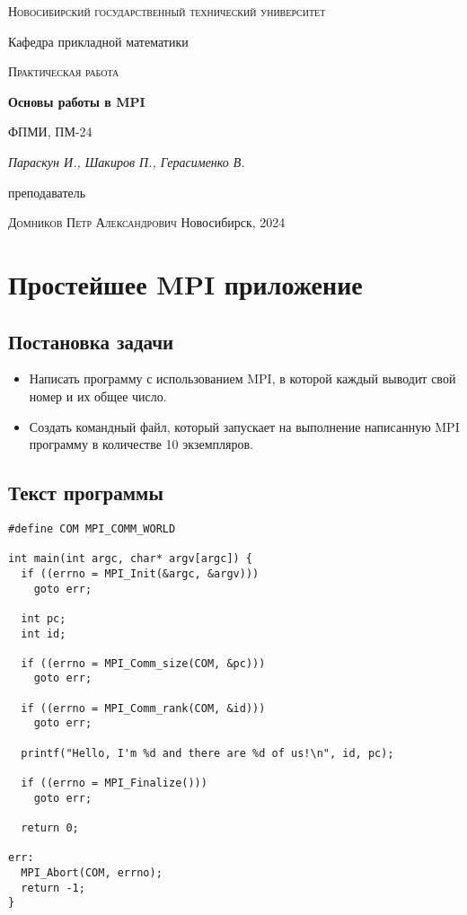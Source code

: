 \documentclass[12pt, a4paper]{article}
\begin{document}
\begin{titlepage}
  \centering
  \textsc{Новосибирский государственный технический университет}\par
  \vspace{1mm}
  Кафедра прикладной математики\par
  \vspace{4cm}
  \textsc{Практическая работа }\par
  {\huge\bfseries Основы работы в MPI\par}
  \vspace{1cm}
  {\scriptsize ФПМИ, ПМ-24\par}
  \vspace{1mm}
  {\itshape\large Параскун И., Шакиров П., Герасименко В.\par}
  \vfill
  {\small преподаватель\par}
  \vspace{1mm}
  \textsc{Домников Петр Александрович}
  \vfill
  \large{Новосибирск, 2024}
\end{titlepage}

\newpage
\setcounter{page}{2}

\section{Простейшее MPI приложение}
\subsection{Постановка задачи}
\begin{itemize}
  \item Написать программу с использованием MPI, в которой каждый выводит свой номер и их общее число.
  \item Создать командный файл, который запускает на выполнение написанную MPI программу в количестве 10 экземпляров.
\end{itemize}

\subsection{Текст программы}

\begin{verbatim}
#define COM MPI_COMM_WORLD

int main(int argc, char* argv[argc]) {
  if ((errno = MPI_Init(&argc, &argv)))
    goto err;

  int pc;
  int id;

  if ((errno = MPI_Comm_size(COM, &pc)))
    goto err;

  if ((errno = MPI_Comm_rank(COM, &id)))
    goto err;

  printf("Hello, I'm %d and there are %d of us!\n", id, pc);

  if ((errno = MPI_Finalize()))
    goto err;

  return 0;

err:
  MPI_Abort(COM, errno);
  return -1;
}
\end{verbatim}
\end{document}
